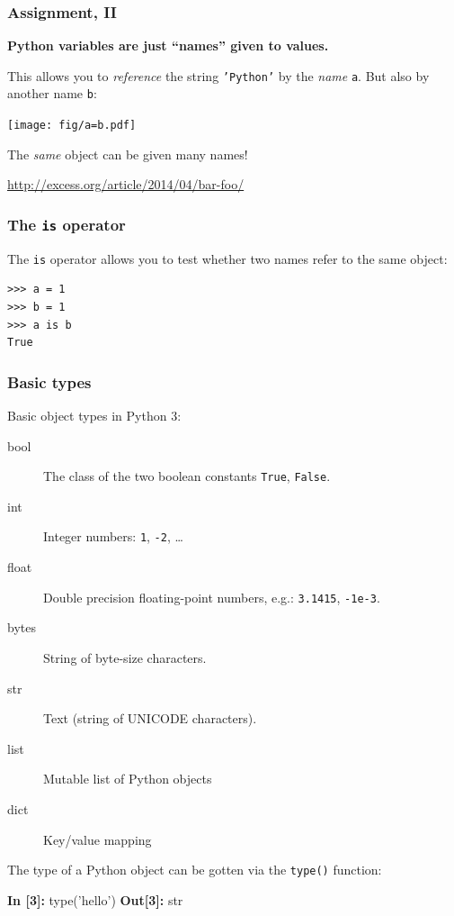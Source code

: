 \documentclass[english,serif,mathserif,xcolor=pdftex,dvipsnames,table]{beamer}
\begin{document}
\begin{frame}[fragile]
  \frametitle{Assignment, II}

  \textbf{Python variables are just ``names'' given to values.}

  \+
  This allows you to \emph{reference} the string \texttt{'Python'}
  by the \emph{name} \texttt{a}.  But also by another name \texttt{b}:

  \+
  \texttt{[image: fig/a=b.pdf]}

  \+
  The \emph{same} object can be given many names!

  \+
  \begin{seealso}
    \scriptsize \url{http://excess.org/article/2014/04/bar-foo/}
  \end{seealso}
\end{frame}


\begin{frame}[fragile]
  \frametitle{The \texttt{is} operator}

  The \texttt{is} operator allows you to test whether two names refer
  to the same object:
\begin{lstlisting}
>>> a = 1
>>> b = 1
>>> a is b
True
\end{lstlisting}

\end{frame}


\begin{frame}[fragile]
  \frametitle{Basic types}
  Basic object types in Python 3:
  \begin{description}
  \item[bool] The class of the two boolean constants \texttt{True}, \texttt{False}.
  \item[int] Integer numbers: \texttt{1}, \texttt{-2}, \ldots
  \item[float] Double precision floating-point numbers, e.g.:
    \texttt{3.1415}, \texttt{-1e-3}.
  \item[bytes] String of byte-size characters.
  \item[str] Text (string of UNICODE characters).
  \item[list] Mutable list of Python objects
  \item[dict] Key/value mapping
  \end{description}

  \+ The type of a Python object can be gotten via the \texttt{type()} function:
\begin{semiverbatim}
{\color{blue}\bfseries In [3]:} type('hello')
{\color{red}\bfseries Out[3]:} str
\end{semiverbatim}
\end{frame}
\end{document}
